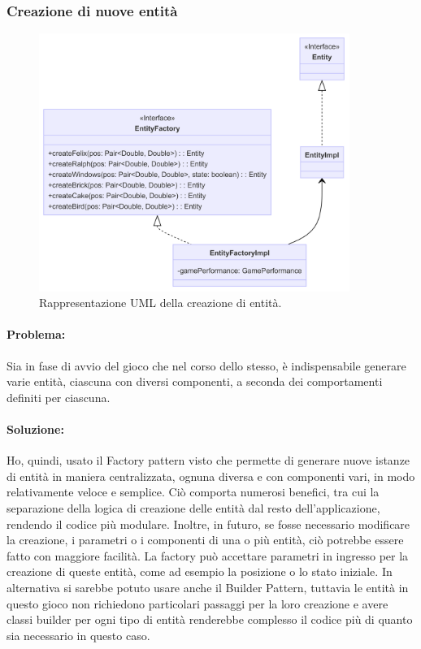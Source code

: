 \documentclass[a4paper,12pt]{report}
\begin{document}
\subsubsection{Creazione di nuove entità}

\begin{figure}[H]
\centering{}
\includegraphics[width=0.9\textwidth]{img/entity_factory.png}
\caption{Rappresentazione UML della creazione di entità.}
\end{figure}

\paragraph{Problema:}
Sia in fase di avvio del gioco che nel corso dello stesso, è indispensabile generare varie entità, ciascuna con diversi componenti, a seconda dei comportamenti definiti per ciascuna.

\paragraph{Soluzione:}
Ho, quindi, usato il Factory pattern visto che permette di generare nuove istanze di entità in maniera centralizzata, ognuna diversa e con componenti vari, in modo relativamente veloce e semplice. Ciò comporta numerosi benefici, tra cui la separazione della logica di creazione delle entità dal resto dell'applicazione, rendendo il codice più modulare. Inoltre, in futuro, se fosse necessario modificare la creazione, i parametri o i componenti di una o più entità, ciò potrebbe essere fatto con maggiore facilità. La factory può accettare parametri in ingresso per la creazione di queste entità, come ad esempio la posizione o lo stato iniziale. In alternativa si sarebbe potuto usare anche il Builder Pattern, tuttavia le entità in questo gioco non richiedono particolari passaggi per la loro creazione e avere classi builder per ogni tipo di entità renderebbe complesso il codice più di quanto sia necessario in questo caso.
\end{document}
